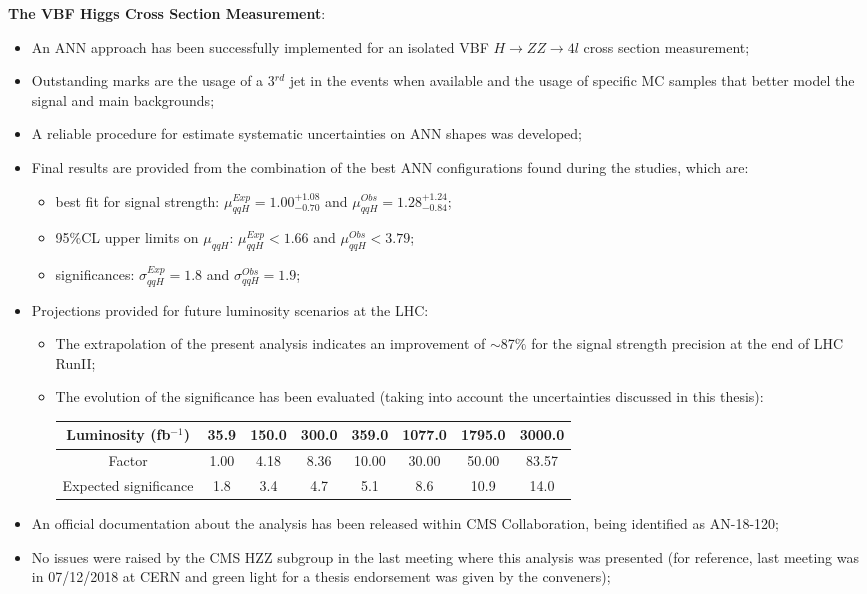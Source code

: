 {\flushleft \textbf{The VBF Higgs Cross Section Measurement}:}
\begin{itemize}
	\item An ANN approach has been successfully implemented for an isolated VBF $H \rightarrow ZZ \rightarrow 4l$ cross section measurement;
	\item Outstanding marks are the usage of a 3$^{rd}$ jet in the events when available and the usage of specific MC samples that better model the signal and main backgrounds;
	\item A reliable procedure for estimate systematic uncertainties on ANN shapes was developed;
	\item Final results are provided from the combination of the best ANN configurations found during the studies, which are:
	\begin{itemize}
		\item best fit for signal strength: $\mu_{qqH}^{Exp} = 1.00_{-0.70}^{+1.08}$ and $\mu_{qqH}^{Obs} = 1.28_{-0.84}^{+1.24}$;
		\item 95$\%$CL upper limits on $\mu_{qqH}$: $\mu_{qqH}^{Exp} < 1.66$ and $\mu_{qqH}^{Obs} < 3.79$;
		\item significances: $\sigma_{qqH}^{Exp} = 1.8$ and $\sigma_{qqH}^{Obs} = 1.9$;
		\end{itemize}
		\item Projections provided for future luminosity scenarios at the LHC:
	\begin{itemize}
		\item The extrapolation of the present analysis indicates an improvement of $\sim$87$\%$ for the signal strength precision at the end of LHC RunII;
		\item The evolution of the significance has been evaluated (taking into account the uncertainties discussed in this thesis):\\
		\begin{tabular}{c|c|c|c|c|c|c|c}
			\hline
			Luminosity (fb$^{-1}$) & 35.9 & 150.0 & 300.0 & 359.0 & 1077.0 & 1795.0 & 3000.0\\
			\hline
			Factor                 & 1.00 & 4.18  & 8.36  & 10.00 & 30.00  & 50.00  & 83.57\\
			\hline
			Expected significance  & 1.8  & 3.4   & 4.7   & 5.1   & 8.6    & 10.9   & 14.0\\
			\hline
		\end{tabular}
	\end{itemize}
	\item An official documentation about the analysis has been released within CMS Collaboration, being identified as AN-18-120;
	\item No issues were raised by the CMS HZZ subgroup in the last meeting where this analysis was presented (for reference, last meeting was in 07/12/2018 at CERN and green light for a thesis endorsement was given by the conveners);
\end{itemize}

